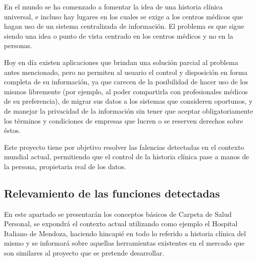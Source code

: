 En el mundo se ha comenzado a fomentar la idea de una historia clínica universal, e incluso hay lugares en los cuales se exige a los centros médicos que hagan uso de un sistema centralizada de  información.
El problema es que sigue siendo una idea o punto de vista centrado en los centros médicos y no en la personas.

Hoy en día existen aplicaciones que brindan una solución parcial al problema antes mencionado, pero no permiten al usuario el control y disposición en forma completa de su información, ya que carecen de la posibilidad de hacer uso de los mismos libremente (por ejemplo, al poder compartirla con profesionales médicos de su preferencia), de migrar sus datos a los sistemas que consideren oportunos, y de manejar la privacidad de la información sin tener que aceptar obligatoriamente los términos y condiciones de empresas que lucren o se reserven derechos sobre éstos.

Este proyecto tiene por objetivo resolver las falencias detectadas en el contexto mundial actual, permitiendo que el control de la historia clínica pase a manos de la persona, propietaria real de los datos.


\subsection{Relevamiento de las funciones detectadas}
En este apartado se presentarán los conceptos básicos de Carpeta de Salud Personal, se expondrá el contexto actual utilizando como ejemplo el Hospital Italiano de Mendoza, haciendo hincapié en todo lo referido a historia clínica del mismo y se informará sobre aquellas herramientas existentes en el mercado que son similares al proyecto que se pretende desarrollar.

